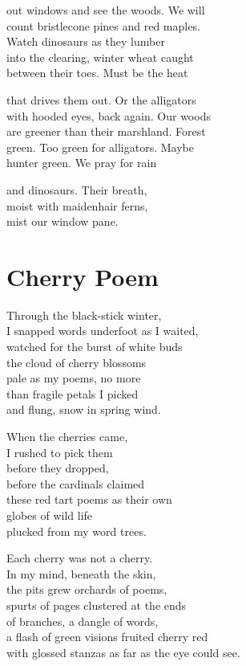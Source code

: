 \documentclass[twoside,10pt]{book}
\begin{document}
out windows and see the woods. We will\\
count bristlecone pines and red maples.\\
Watch dinosaurs as they lumber\\
into the clearing, winter wheat caught\\
between their toes. Must be the heat

that drives them out. Or the alligators\\
with hooded eyes, back again. Our woods\\
are greener than their marshland. Forest\\
green. Too green for alligators. Maybe\\
hunter green. We pray for rain

and dinosaurs. Their breath,\\
moist with maidenhair ferns,\\
mist our window pane.


\clearpage
\section{Cherry Poem}

Through the black-stick winter,\\
I snapped words underfoot as I waited,\\
watched for the burst of white buds\\
the cloud of cherry blossoms\\
pale as my poems, no more\\
than fragile petals I picked\\
and flung, snow in spring wind.

When the cherries came,\\
I rushed to pick them\\
before they dropped,\\
before the cardinals claimed\\
these red tart poems as their own\\
globes of wild life\\
plucked from my word trees.

Each cherry was not a cherry.\\
In my mind, beneath the skin,\\
the pits grew orchards of poems,\\
spurts of pages clustered at the ends\\
of branches, a dangle of words,\\
a flash of green visions fruited cherry red\\
with glossed stanzas as far as the eye could see.
\end{document}

